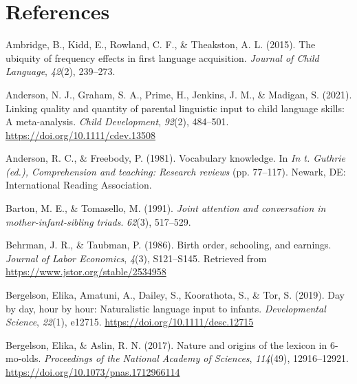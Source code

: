 \documentclass[
  english,
  man,floatsintext]{apa6}
\newlength{\cslhangindent}
\newenvironment{CSLReferences}[2] %
 {%
  \setlength{\parindent}{0pt}
  \ifodd #1 \everypar{\setlength{\hangindent}{\cslhangindent}}\ignorespaces\fi
  \ifnum #2 > 0
  \setlength{\parskip}{#2\baselineskip}
  \fi
 }%
 {}
\begin{document}
\newpage

\hypertarget{references}{%
\section{References}\label{references}}

\begingroup
\setlength{\parindent}{-0.5in}
\setlength{\leftskip}{0.5in}

\hypertarget{refs}{}
\begin{CSLReferences}{1}{0}
\leavevmode{}%
Ambridge, B., Kidd, E., Rowland, C. F., \& Theakston, A. L. (2015). The ubiquity of frequency effects in first language acquisition. \emph{Journal of Child Language}, \emph{42}(2), 239--273.

\leavevmode{}%
Anderson, N. J., Graham, S. A., Prime, H., Jenkins, J. M., \& Madigan, S. (2021). Linking quality and quantity of parental linguistic input to child language skills: A meta-analysis. \emph{Child Development}, \emph{92}(2), 484--501. \url{https://doi.org/10.1111/cdev.13508}

\leavevmode{}%
Anderson, R. C., \& Freebody, P. (1981). Vocabulary knowledge. In \emph{In t. Guthrie (ed.), Comprehension and teaching: Research reviews} (pp. 77--117). Newark, {DE}: International Reading Association.

\leavevmode{}%
Barton, M. E., \& Tomasello, M. (1991). \emph{Joint attention and conversation in mother-infant-sibling triads}. \emph{62}(3), 517--529.

\leavevmode{}%
Behrman, J. R., \& Taubman, P. (1986). Birth order, schooling, and earnings. \emph{Journal of Labor Economics}, \emph{4}(3), S121--S145. Retrieved from \url{https://www.jstor.org/stable/2534958}

\leavevmode{}%
Bergelson, Elika, Amatuni, A., Dailey, S., Koorathota, S., \& Tor, S. (2019). Day by day, hour by hour: Naturalistic language input to infants. \emph{Developmental Science}, \emph{22}(1), e12715. \url{https://doi.org/10.1111/desc.12715}

\leavevmode{}%
Bergelson, Elika, \& Aslin, R. N. (2017). Nature and origins of the lexicon in 6-mo-olds. \emph{Proceedings of the National Academy of Sciences}, \emph{114}(49), 12916--12921. \url{https://doi.org/10.1073/pnas.1712966114}


\end{CSLReferences}
\end{document}
